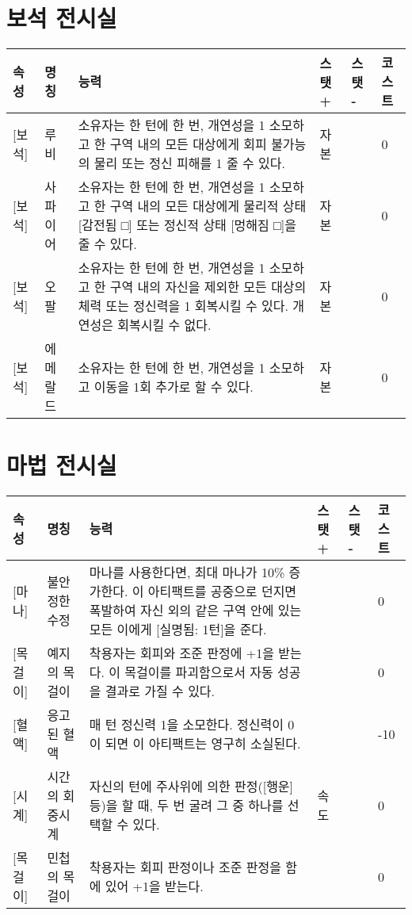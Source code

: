 \documentclass{report}
\begin{document}
	\section*{보석 전시실}
	\begin{tabularx}{\textwidth}{l!{\color{black}\vrule}l!{\color{black}\vrule}X!{\color{black}\vrule}l!{\color{black}\vrule}l!{\color{black}\vrule}l}
		\textbf{속성} & \textbf{명칭} & \textbf{능력} & \textbf{스탯 +} & \textbf{스탯 -} & \textbf{코스트}\\ \hline \hline
		[저주][보석]& 루비   & 소유자는 한 턴에 한 번, 개연성을 1 소모하고 한 구역 내의 모든 대상에게 회피 불가능의 물리 또는 정신 피해를 1 줄 수 있다.   & 자본     & & 0    \\ \hline
		[저주][보석]& 사파이어   & 소유자는 한 턴에 한 번, 개연성을 1 소모하고 한 구역 내의 모든 대상에게 물리적 상태 [감전됨 □] 또는 정신적 상태 [멍해짐 □]을 줄 수 있다.   & 자본     & & 0    \\ \hline
		[저주][보석]& 오팔   &  소유자는 한 턴에 한 번, 개연성을 1 소모하고 한 구역 내의 자신을 제외한 모든 대상의 체력 또는 정신력을 1 회복시킬 수 있다. 개연성은 회복시킬 수 없다.  & 자본     & & 0    \\ \hline
		[저주][보석]& 에메랄드   & 소유자는 한 턴에 한 번, 개연성을 1 소모하고 이동을 1회 추가로 할 수 있다.   & 자본     & & 0    \\ 
	\end{tabularx}
	
	\section*{마법 전시실}
	\begin{tabularx}{\textwidth}{l!{\color{black}\vrule}l!{\color{black}\vrule}X!{\color{black}\vrule}l!{\color{black}\vrule}l!{\color{black}\vrule}l}
		\textbf{속성} & \textbf{명칭} & \textbf{능력} & \textbf{스탯 +} & \textbf{스탯 -} & \textbf{코스트} \\ \hline \hline
		[마법][마나]& 불안정한 수정 & 마나를 사용한다면, 최대 마나가 10\% 증가한다. 이 아티팩트를 공중으로 던지면 폭발하여 자신 외의 같은 구역 안에 있는 모든 이에게 [실명됨: 1턴]을 준다. &  & & 0 \\ \hline
		[마법][목걸이]& 예지의 목걸이 & 착용자는 회피와 조준 판정에 +1을 받는다. 이 목걸이를 파괴함으로서 자동 성공을 결과로 가질 수 있다. &  & & 0 \\ \hline
		[흑마법][혈액] & 응고된 혈액 & 매 턴 정신력 1을 소모한다. 정신력이 0이 되면 이 아티팩트는 영구히 소실된다. &  & & -10 \\ \hline
		[마법][시계] & 시간의 회중시계 & 자신의 턴에 주사위에 의한 판정([행운] 등)을 할 때, 두 번 굴려 그 중 하나를 선택할 수 있다.& 속도 & & 0 \\ \hline
		[마법][목걸이]& 민첩의 목걸이 & 착용자는 회피 판정이나 조준 판정을 함에 있어 +1을 받는다. &  & & 0 \\
	\end{tabularx}
	
\end{document}
